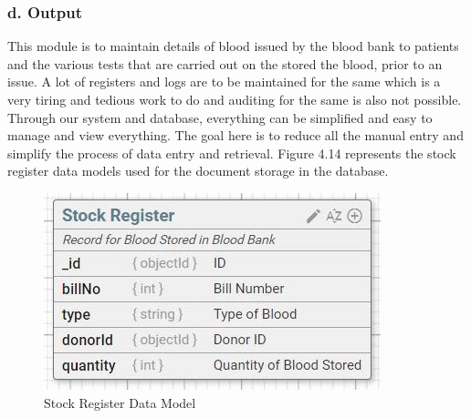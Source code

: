\documentclass[BTech]{srmuthesis}
\begin{document}
\subsubsection{d. Output}
This module is to maintain details of blood issued by the blood bank to patients and the various tests that are carried out on the stored the blood, prior to an issue. A lot of registers and logs are to be maintained for the same which is a very tiring and tedious work to do and auditing for the same is also not possible. Through our system and database, everything can be simplified and easy to manage and view everything. The goal here is to reduce all the manual entry and simplify the process of data entry and retrieval. Figure 4.14 represents the stock register data models used for the document storage in the database.
\begin{figure}[H]
	\centering
	\includegraphics[scale=0.6]{output_stock_reg.jpeg}
	\caption{Stock Register Data Model}
\end{figure}
\end{document}
